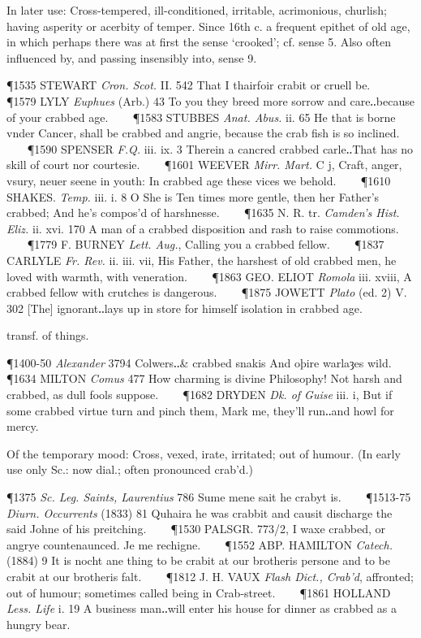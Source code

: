 \begin{description}[wide, labelwidth=!, labelindent=0pt]
\begin{myenumerate}
 In later use: Cross-tempered, ill-conditioned, irritable, acrimonious, churlish; having asperity or acerbity of temper. Since 16th c. a frequent epithet of old age, in which perhaps there was at first the sense ‘crooked’; cf. sense 5. Also often influenced by, and passing insensibly into, sense 9.

\P 1535 STEWART  \textit{Cron. Scot.} II. 542 That I thairfoir crabit or cruell be.    
\P 1579 LYLY  \textit{Euphues} (Arb.) 43 To you they breed more sorrow and care‥because of your crabbed age.    
\P 1583 STUBBES  \textit{Anat. Abus.} ii. 65 He that is borne vnder Cancer, shall be crabbed and angrie, because the crab fish is so inclined.    
\P 1590 SPENSER  \textit{F.Q.} iii. ix. 3 Therein a cancred crabbed carle‥That has no skill of court nor courtesie.    
\P 1601 WEEVER  \textit{Mirr. Mart.} C j, Craft, anger, vsury, neuer seene in youth: In crabbed age these vices we behold.    
\P 1610 SHAKES.  \textit{Temp.} iii. i. 8 O She is Ten times more gentle, then her Father's crabbed; And he's compos'd of harshnesse.    
\P 1635 N. R. tr.  \textit{Camden's Hist. Eliz.} ii. xvi. 170 A man of a crabbed disposition and rash to raise commotions.    
\P 1779 F. BURNEY  \textit{Lett. Aug.}, Calling you a crabbed fellow.    
\P 1837 CARLYLE  \textit{Fr. Rev.} ii. iii. vii, His Father, the harshest of old crabbed men, he loved with warmth, with veneration.    
\P 1863 GEO. ELIOT  \textit{Romola} iii. xviii, A crabbed fellow with crutches is dangerous.    
\P 1875 JOWETT  \textit{Plato} (ed. 2) V. 302 [The] ignorant‥lays up in store for himself isolation in crabbed age.

 transf. of things.

\P 1400-50 \textit{Alexander}  3794 Colwers‥\& crabbed snakis And oþire warlaȝes wild.    
\P 1634 MILTON  \textit{Comus} 477 How charming is divine Philosophy! Not harsh and crabbed, as dull fools suppose.    
\P 1682 DRYDEN  \textit{Dk. of Guise} iii. i, But if some crabbed virtue turn and pinch them, Mark me, they'll run‥and howl for mercy.

 Of the temporary mood: Cross, vexed, irate, irritated; out of humour. (In early use only Sc.: now dial.; often pronounced crab'd.)

\P 1375  \textit{Sc. Leg. Saints, Laurentius} 786 Sume mene sait he crabyt is.    
\P 1513-75 \textit{Diurn.  Occurrents} (1833) 81 Quhaira he was crabbit and causit discharge the said Johne of his preitching.    
\P 1530 PALSGR. 773/2, I waxe crabbed, or angrye countenaunced. Je me rechigne.    
\P 1552 ABP. HAMILTON  \textit{Catech.} (1884) 9 It is nocht ane thing to be crabit at our brotheris persone and to be crabit at our brotheris falt.    
\P 1812 J. H. VAUX  \textit{Flash Dict., Crab'd}, affronted; out of humour; sometimes called being in Crab-street.    
\P 1861 HOLLAND  \textit{Less. Life} i. 19 A business man‥will enter his house for dinner as crabbed as a hungry bear.


\end{myenumerate}
\end{description}
